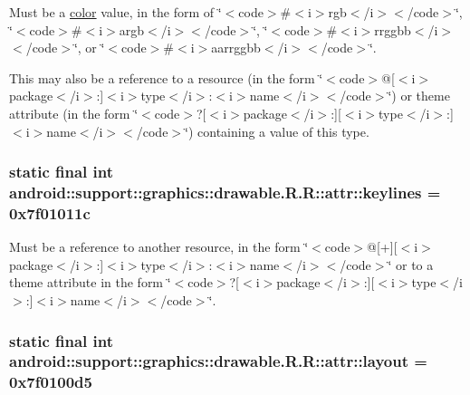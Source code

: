 Must be a \hyperlink{classandroid_1_1support_1_1graphics_1_1drawable_1_1_r_1_1color}{color} value, in the form of \char`\"{}$<$code$>$\#$<$i$>$rgb$<$/i$>$$<$/code$>$\char`\"{}, \char`\"{}$<$code$>$\#$<$i$>$argb$<$/i$>$$<$/code$>$\char`\"{}, \char`\"{}$<$code$>$\#$<$i$>$rrggbb$<$/i$>$$<$/code$>$\char`\"{}, or \char`\"{}$<$code$>$\#$<$i$>$aarrggbb$<$/i$>$$<$/code$>$\char`\"{}. 

This may also be a reference to a resource (in the form \char`\"{}$<$code$>$@\mbox{[}$<$i$>$package$<$/i$>$:\mbox{]}$<$i$>$type$<$/i$>$:$<$i$>$name$<$/i$>$$<$/code$>$\char`\"{}) or theme attribute (in the form \char`\"{}$<$code$>$?\mbox{[}$<$i$>$package$<$/i$>$:\mbox{]}\mbox{[}$<$i$>$type$<$/i$>$:\mbox{]}$<$i$>$name$<$/i$>$$<$/code$>$\char`\"{}) containing a value of this type. \hypertarget{classandroid_1_1support_1_1graphics_1_1drawable_1_1_r_1_1attr_c94b17abaadf41ef50a46552c92ae312}{
\subsubsection[{keylines}]{\setlength{\rightskip}{0pt plus 5cm}static final int android::support::graphics::drawable.R.R::attr::keylines = 0x7f01011c}}
\label{classandroid_1_1support_1_1graphics_1_1drawable_1_1_r_1_1attr_c94b17abaadf41ef50a46552c92ae312}


Must be a reference to another resource, in the form \char`\"{}$<$code$>$@\mbox{[}+\mbox{]}\mbox{[}$<$i$>$package$<$/i$>$:\mbox{]}$<$i$>$type$<$/i$>$:$<$i$>$name$<$/i$>$$<$/code$>$\char`\"{} or to a theme attribute in the form \char`\"{}$<$code$>$?\mbox{[}$<$i$>$package$<$/i$>$:\mbox{]}\mbox{[}$<$i$>$type$<$/i$>$:\mbox{]}$<$i$>$name$<$/i$>$$<$/code$>$\char`\"{}. \hypertarget{classandroid_1_1support_1_1graphics_1_1drawable_1_1_r_1_1attr_4584f08f639ce13597df1046bed4677e}{
\subsubsection[{layout}]{\setlength{\rightskip}{0pt plus 5cm}static final int android::support::graphics::drawable.R.R::attr::layout = 0x7f0100d5}}
\label{classandroid_1_1support_1_1graphics_1_1drawable_1_1_r_1_1attr_4584f08f639ce13597df1046bed4677e}


